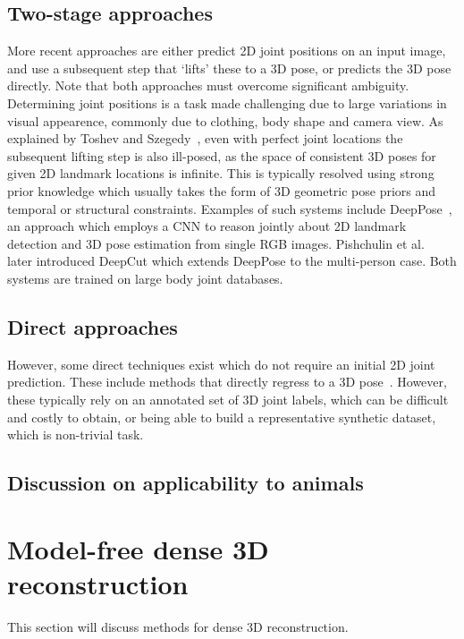 \subsection{Two-stage approaches}
More recent approaches are either predict 2D joint positions on an input image, and use a subsequent step that `lifts' these to a 3D pose, or predicts the 3D pose directly. Note that both approaches must overcome significant ambiguity. Determining joint positions is a task made challenging due to large variations in visual appearence, commonly due to clothing, body shape and camera view. As explained by Toshev and Szegedy~\cite{toshev2014deeppose}, even with perfect joint locations the subsequent lifting step is also ill-posed, as the space of consistent 3D poses for given 2D landmark locations is infinite. This is typically resolved using strong prior knowledge which usually takes the form of 3D geometric pose priors and temporal or structural constraints. Examples of such systems include DeepPose~\cite{toshev2014deeppose}, an approach which employs a CNN to reason jointly about 2D landmark detection and 3D pose estimation from single RGB images. Pishchulin et al.~\cite{pishchulin2016deepcut} later introduced DeepCut which extends DeepPose to the multi-person case. Both systems are trained on large body joint databases. 

\subsection{Direct approaches}
However, some direct techniques exist which do not require an initial 2D joint prediction. These include methods that directly regress to a 3D pose~\cite{tekin2016direct}. However, these typically rely on an annotated set of 3D joint labels, which can be difficult and costly to obtain, or being able to build a representative synthetic dataset, which is non-trivial task.


\subsection{Discussion on applicability to animals}

\section{Model-free dense 3D reconstruction}

This section will discuss methods for dense 3D reconstruction. 

